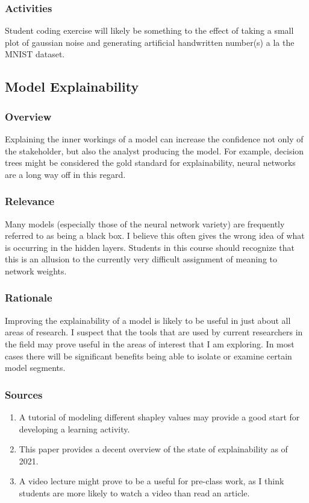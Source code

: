 \documentclass[12pt]{amsart}
\begin{document}
\subsubsection{Activities}
Student coding exercise will likely be something to the effect of taking a small plot of gaussian noise
and generating artificial handwritten number(s) a la the MNIST dataset.



\subsection{Model Explainability}
\subsubsection{Overview}
Explaining the inner workings of a model can increase the confidence not only of the stakeholder,
but also the analyst producing the model. For example, decision trees might be considered the gold standard
for explainability, neural networks are a long way off in this regard.

\subsubsection{Relevance}
Many models (especially those of the neural network variety) are frequently referred to as being a black box. 
I believe this often gives the wrong idea of what is occurring in the hidden layers.
Students in this course should recognize that this is an allusion to the currently very difficult 
assignment of meaning to network weights.

\subsubsection{Rationale}
Improving the explainability of a model is likely to be useful in just about all areas of research.
I suspect that the tools that are used by current researchers in the field may prove useful
in the areas of interest that I am exploring. In most cases there will be significant benefits 
being able to isolate or examine certain model segments.

\subsubsection{Sources}
\begin{enumerate}
	\item A tutorial \cite{} of modeling different shapley values may provide a good start
	for developing a learning activity.
	\item This paper \cite{} provides a decent overview of the state of explainability as of 2021.
	\item A video lecture \cite{} might prove to be a useful
	for pre-class work, as I think students are more likely to watch a video than read an article.	
\end{enumerate}
\end{document}
